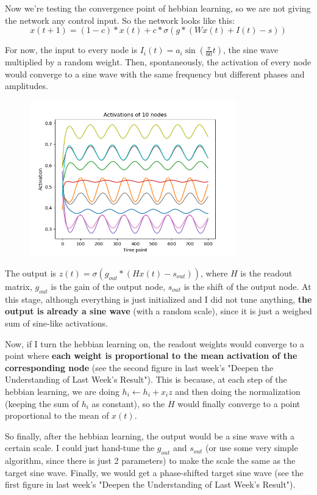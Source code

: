 \documentclass[12pt, a4paper]{article}
\begin{document}
Now we're testing the convergence point of hebbian learning, so we are not giving the network any control input. So the network looks like this:
$$x(t+1) = (1-c)*x(t) + c*\sigma(g * (Wx(t) + I(t) - s))$$

For now, the input to every node is $I_i(t) = a_i \sin(\frac{\pi}{60}t)$, the sine wave multiplied by a random weight. Then, spontaneously, the activation of every node would converge to a sine wave with the same frequency but different phases and amplitudes.

\begin{figure}[H]
    \centering
    \includegraphics[width=0.8\textwidth]{RNN/FORCE/fig/FORCE_ff_activations.png}
\end{figure}

The output is $z(t)=\sigma(g_{out}*(Hx(t)-s_{out}))$, where $H$ is the readout matrix, $g_{out}$ is the gain of the output node, $s_{out}$ is the shift of the output node. At this stage, although everything is just initialized and I did not tune anything, \textbf{the output is already a sine wave} (with a random scale), since it is just a weighed sum of sine-like activations.

Now, if I turn the hebbian learning on, the readout weights would converge to a point where \textbf{each weight is proportional to the mean activation of the corresponding node} (see the second figure in last week's "Deepen the Understanding of Last Week's Result"). This is because, at each step of the hebbian learning, we are doing $h_i \leftarrow h_i + x_i z$ and then doing the normalization (keeping the sum of $h_i$ as constant), so the $H$ would finally converge to a point proportional to the mean of $x(t)$.

So finally, after the hebbian learning, the output would be a sine wave with a certain scale. I could just hand-tune the $g_{out}$ and $s_{out}$ (or use some very simple algorithm, since there is just 2 parameters) to make the scale the same as the target sine wave. Finally, we would get a phase-shifted target sine wave (see the first figure in last week's "Deepen the Understanding of Last Week's Result").
\end{document}
